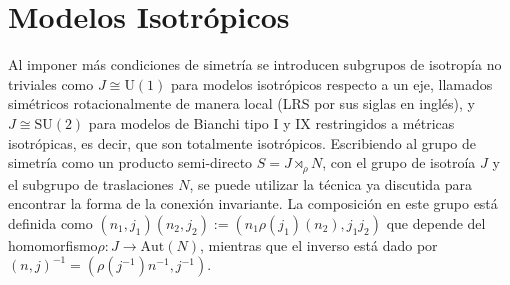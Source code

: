 
\section{Modelos Isotr\'{o}picos}

Al imponer m\'{a}s condiciones de simetr\'{i}a se introducen subgrupos de isotrop\'{i}a no triviales como $J \cong \mathrm{U}(1)$ para modelos isotr\'{o}picos respecto a un eje, llamados sim\'{e}tricos rotacionalmente de manera local (LRS por sus siglas en ingl\'{e}s), y $J \cong \mathrm{SU}(2)$ para modelos de Bianchi tipo I y IX restringidos a m\'{e}tricas isotr\'{o}picas, es decir, que son totalmente isotr\'{o}picos. Escribiendo al grupo de simetr\'{i}a como un producto semi-directo $S = J \rtimes_{\rho} N$, con el grupo de isotro\'{i}a $J$ y el subgrupo de traslaciones $N$, se puede utilizar la t\'{e}cnica ya discutida para encontrar la forma de la conexi\'{o}n invariante. La composici\'{o}n en este grupo est\'{a} definida como $(n_{1}, j_{1})(n_{2}, j_{2}) := (n_{1} \rho(j_{1}) (n_{2}), j_{1} j_{2} )$ que depende del homomorfismo\footnotemark $\rho: J \longrightarrow \mathrm{Aut}(N)$, mientras que el inverso est\'{a} dado por $(n, j)^{-1} = (\rho(j^{-1}) n^{-1}, j^{-1})$.

